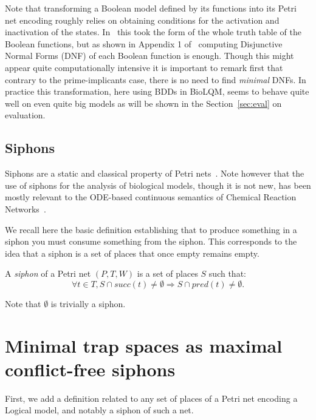 \documentclass[runningheads]{llncs}
\begin{document}

Note that transforming a Boolean model defined by its functions into its Petri net encoding roughly relies on obtaining conditions for the activation and inactivation of the states. In~\cite{chaouiya2004qualitative} this took the form of the whole truth table of the Boolean functions, but as shown in Appendix 1 of~\cite{chatain2014characterization} computing Disjunctive Normal Forms (DNF) of each Boolean function is enough.
Though this might appear quite computationally intensive it is important to remark first that contrary to the prime-implicants case, there is no need to find \emph{minimal} DNFs.
In practice this transformation, here using BDDs in BioLQM, seems to behave quite well on even quite big models as will be shown in the Section~\ref{sec:eval} on evaluation.

\subsection{Siphons}

Siphons are a static and classical property of Petri nets~\cite{peterson1981petri}.
Note however that the use of siphons for the analysis of biological models, though it is not new, has been mostly relevant to the ODE-based continuous semantics of Chemical Reaction Networks~\cite{angeli2007petri,angeli2011persistence,degrand2020graphical}.

We recall here the basic definition establishing that to produce something in a siphon you must consume something from the siphon.
This corresponds to the idea that a siphon is a set of places that once empty remains empty.

\begin{definition}

  A \emph{siphon} of a Petri net \((P, T, W)\) is a set of places \(S\) such that:
  \[\forall t\in T, S\cap succ(t)\not =\emptyset\Rightarrow S\cap pred(t)\not =\emptyset.\]

\end{definition}

Note that \(\emptyset\) is trivially a siphon.

\section{Minimal trap spaces as maximal conflict-free siphons}
First, we add a definition related to any set of places of a Petri net encoding a Logical model, and notably a siphon of such a net.
\end{document}
